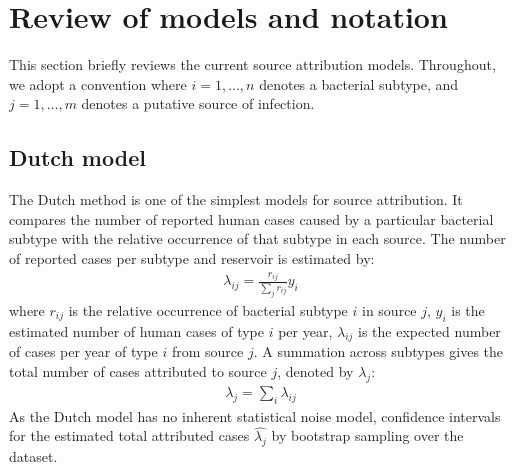 \section{Review of models and notation}\label{sec:review}

This section briefly reviews the current source attribution models. Throughout, we adopt a convention where $i=1,\dots,n$ denotes a bacterial subtype, and $j=1,\dots,m$ denotes a putative source of 
infection.


\subsection{Dutch model}\label{sec:dutch}
The Dutch method \citep{Dutch1999} is one of the simplest models for source attribution. It compares the number of reported human cases caused by a particular bacterial subtype with the relative 
occurrence of that subtype in each source. The number of reported cases per subtype and reservoir is estimated by:
\begin{eqnarray}
\lambda_{ij}=\frac{r_{ij}}{\sum_j r_{ij}}y_i
\end{eqnarray}
where $r_{ij}$ is the relative occurrence of bacterial subtype $i$ in source $j$,
$y_i$ is the estimated number of human cases of type $i$ per year,
$\lambda_{ij}$ is the expected number of cases per year of type $i$ from source $j$. A summation across subtypes gives the total number of cases attributed to source $j$,
denoted by $\lambda_j$:
\begin{eqnarray}
\lambda_j=\sum_i \lambda_{ij} 
\end{eqnarray}
As the Dutch model has no inherent statistical noise model, confidence intervals for the estimated total attributed cases $\hat{\lambda_j}$ by bootstrap sampling over the dataset.


